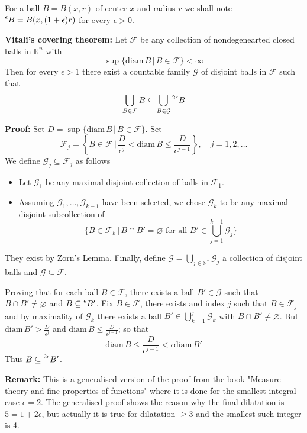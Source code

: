 \documentclass{article}
\begin{document}
For a ball $B=B(x, r)$ of center $x$ and radius $r$ we shall note $\prescript{\epsilon}{}B
=B(x, (1+\epsilon)r)$ for every $\epsilon>0$.

\vspace{1ex}
\textbf{Vitali's covering theorem:}
Let $\mathcal{F}$ be any collection of nondegenearted closed balls in
$\mathbb{R}^n$ with
\[ \sup\{\text{diam}\,B\,|\, B\in\mathcal{F}\}<\infty \]
Then for every $\epsilon>1$ there exist a countable family $\mathcal{G}$ of
disjoint balls in $\mathcal{F}$ such that
\[\bigcup_{B\in\mathcal{F}}B\subseteq\bigcup_{B\in\mathcal{G}}\prescript{2\epsilon}{}B\]

\vspace{1ex}
\textbf{Proof:}
Set $D=\sup\{\text{diam}\,B\,|\,B\in \mathcal{F}\}$. Set
\[\mathcal{F}_j=\left\{B\in\mathcal{F}\,|\,\frac{D}{\epsilon^j}<\text{diam}\,B\leq\frac{D}{\epsilon^{j-1}}\right\},\quad j=1,2,\ldots\]
We define $\mathcal{G}_j\subseteq\mathcal{F}_j$ as follows
\begin{itemize}
    \item Let $\mathcal{G}_1$ be any maximal disjoint collection of balls in
        $\mathcal{F}_1$.

    \item Assuming $\mathcal{G}_1,\ldots,\mathcal{G}_{k-1}$ have been selected,
        we chose $\mathcal{G}_k$ to be any maximal disjoint subcollection of
        \[ \{B\in\mathcal{F}_k\,|\,B\cap B'=\varnothing\text{ for all }B'\in\bigcup_{j=1}^{k-1}\mathcal{G}_j\}\]
\end{itemize}
They exist by Zorn's Lemma. Finally, define $\mathcal{G}=\bigcup_{j\in\mathbb{N}^*}\mathcal{G}_j$
a collection of disjoint balls and $\mathcal{G}\subseteq\mathcal{F}$.

\vspace{1ex}
Proving that for each ball $B\in\mathcal{F}$, there exists a ball $B'\in\mathcal{G}$
such that $B\cap B'\neq\varnothing$ and $B\subseteq\prescript{\epsilon}{}B'$. Fix
$B\in\mathcal{F}$, there exists and index $j$ such that $B\in\mathcal{F}_j$ and
by maximality of $\mathcal{G}_k$ there exists a ball $B'\in\bigcup_{k=1}^j
\mathcal{G}_k$ with $B\cap B'\neq\varnothing$. But $\text{diam}\,B'>\frac{D}{\epsilon^j}$
and $\text{diam}\,B\leq\frac{D}{\epsilon^{j-1}}$; so that
\[ \text{diam}\,B\leq \frac{D}{\epsilon^{j-1}} < \epsilon\text{diam}\,B'\]
Thus $B\subseteq\prescript{2\epsilon}{}B'$.

\vspace{1ex}
\textbf{Remark:} This is a generalised version of the proof from the book
"Measure theory and fine properties of functions" where it is done for the
smallest integral case $\epsilon = 2$. The generalised proof shows the reason
why the final dilatation is $5 = 1+2\epsilon$, but actually it is true for
dilatation $\ge 3$ and the smallest such integer is 4.
\end{document}
